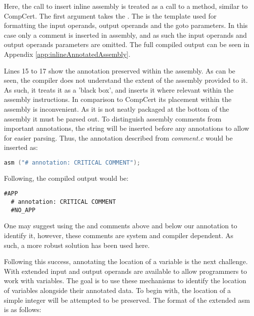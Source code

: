 

Here, the call to insert inline assembly is treated as a call to a method, similar to CompCert. The first argument takes the . The  is the template used for formatting the input operands, output operands and the goto parameters. In this case only a comment is inserted in assembly, and as such the input operands and output operands parameters are omitted. The full compiled output can be seen in Appendix \ref{app:inlineAnnotatedAssembly}.



Lines 15 to 17 show the annotation preserved within the assembly. As can be seen, the compiler does not understand the extent of the assembly provided to it. As such, it treats it as a 'black box', and inserts it where relevant within the assembly instructions. In comparison to CompCert its placement within the assembly is inconvenient. As it is not neatly packaged at the bottom of the assembly it must be parsed out. To distinguish assembly comments from important annotations, the string  will be inserted before any annotations to allow for easier parsing. Thus, the annotation described from \textit{comment.c} would be inserted as:

\begin{lstlisting}[firstnumber=2, language=C]
    asm ("# annotation: CRITICAL COMMENT");
\end{lstlisting}

Following, the compiled output would be:
\begin{lstlisting}[firstnumber=15]
  #APP
  # annotation: CRITICAL COMMENT
  #NO_APP
\end{lstlisting}

One may suggest using the  and  comments above and below our annotation to identify it, however, these comments are system and compiler dependent. As such, a more robust solution has been used here.

Following this success, annotating the location of a variable is the next challenge. With extended  input and output operands are available to allow programmers to work with variables. The goal is to use these mechanisms to identify the location of variables alongside their annotated data. To begin with, the location of a simple integer will be attempted to be preserved. The format of the extended asm is as follows:

